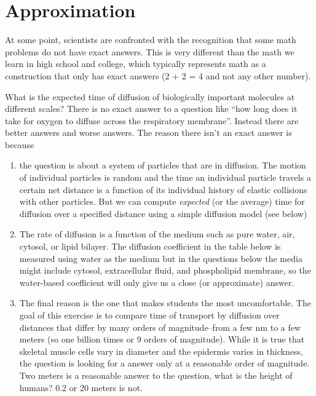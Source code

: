 \documentclass[]{book}
\providecommand{\tightlist}{%
  \setlength{\itemsep}{0pt}\setlength{\parskip}{0pt}}
\begin{document}
\section{Approximation}\label{approximation}

At some point, scientists are confronted with the recognition that some
math problems do not have exact answers. This is very different than the
math we learn in high school and college, which typically represents
math as a construction that only has exact answers (2 + 2 = 4 and not
any other number).

What is the expected time of diffusion of biologically important
molecules at different scales? There is no exact answer to a question
like ``how long does it take for oxygen to diffuse across the
respiratory membrane''. Instead there are better answers and worse
answers. The reason there isn't an exact answer is because

\begin{enumerate}
\def\labelenumi{\arabic{enumi}.}
\tightlist
\item
  the question is about a system of particles that are in diffusion. The
  motion of individual particles is random and the time an individual
  particle travels a certain net distance is a function of its
  individual history of elastic collisions with other particles. But we
  can compute \emph{expected} (or the average) time for diffusion over a
  specified distance using a simple diffusion model (see below)
\item
  The rate of diffusion is a function of the medium such as pure water,
  air, cytosol, or lipid bilayer. The diffusion coefficient in the table
  below is measured using water as the medium but in the questions below
  the media might include cytosol, extracellular fluid, and phospholipid
  membrane, so the water-based coefficient will only give us a close (or
  approximate) answer.
\item
  The final reason is the one that makes students the most
  uncomfortable. The goal of this exercise is to compare time of
  transport by diffusion over distances that differ by many orders of
  magnitude--from a few nm to a few meters (so one billion times or 9
  orders of magnitude). While it is true that skeletal muscle cells vary
  in diameter and the epidermis varies in thickness, the question is
  looking for a answer only at a reasonable order of magnitude. Two
  meters is a reasonable answer to the question, what is the height of
  humans? 0.2 or 20 meters is not.
\end{enumerate}
\end{document}
